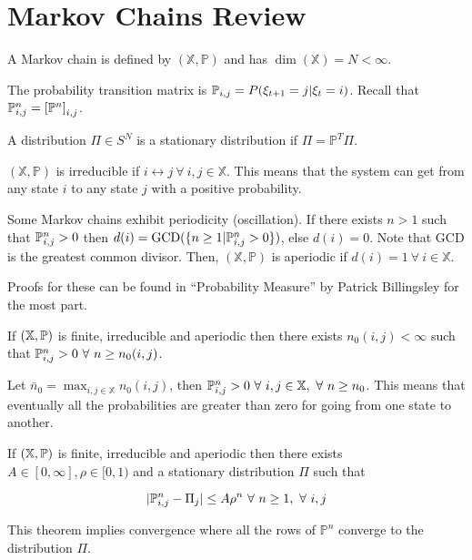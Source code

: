\mainmatter%
\setcounter{page}{1}

\lectureseries[\course]{\course}

\date{October 29, 2009}

\setaddress%

\setcounter{lecture}{9}
\setcounter{chapter}{9}


\section{Markov Chains Review}
A Markov chain is defined by $(\mathbb{X},\mathbb{P})$ and has $\dim(\mathbb{X})=N<\infty$.

The probability transition matrix is $\mathbb{P}_{i,j}=P(\xi_{t+1}=j|\xi_t=i)$.
Recall that $\mathbb{P}_{i,j}^n={[\mathbb{P}^n]}_{i,j}$.

A distribution $\Pi\in S^N$ is a stationary distribution if $\Pi=\mathbb{P}^T\Pi$.

$(\mathbb{X},\mathbb{P})$ is irreducible if $i\leftrightarrow j~\forall~i,j\in\mathbb{X}$.
This means that the system can get from any state $i$ to any state $j$ with a positive probability.

Some Markov chains exhibit periodicity (oscillation).
If there exists $n>1$ such that $\mathbb{P}_{i,j}^n>0$ then $d(i)=\text{GCD}(\{n\geq1|\mathbb{P}_{i,j}^n>0\})$, else $d(i)=0$.
Note that $\text{GCD}$ is the greatest common divisor.
Then, $(\mathbb{X},\mathbb{P})$ is aperiodic if $d(i)=1~\forall~i\in\mathbb{X}$.

Proofs for these can be found in ``Probability Measure'' by Patrick Billingsley for the most part.

\begin{lemma}
If $(\mathbb{X},\mathbb{P})$ is finite, irreducible and aperiodic then there exists $n_0(i,j)<\infty$ such that $\mathbb{P}_{i,j}^n>0~\forall~n\geq n_0(i,j)$.
\end{lemma}
Let $\bar{n}_0=\max_{i,j\in\mathbb{X}}n_0(i,j)$, then $\mathbb{P}_{i,j}^n>0~\forall~i,j\in\mathbb{X},~\forall~n\geq n_0$.
This means that eventually all the probabilities are greater than zero for going from one state to another.

\begin{theorem}%
\label{th:distconverge}
If $(\mathbb{X},\mathbb{P})$ is finite, irreducible and aperiodic then there exists $A\in[0,\infty], \rho\in[0,1)$ and a stationary distribution $\Pi$ such that%

\begin{equation*}
|\mathbb{P}_{i,j}^n-\Pi_j|\leq A\rho^n~\forall~n\geq1,~\forall~i,j
\end{equation*}

\end{theorem}
This theorem implies convergence where all the rows of $\mathbb{P}^n$ converge to the distribution $\Pi$.

